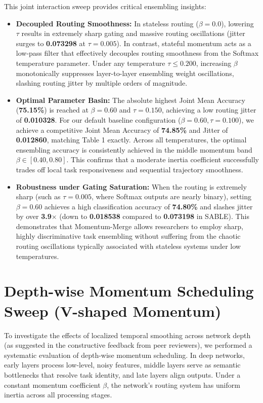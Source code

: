 \documentclass{article}
\theoremstyle{plain}
\theoremstyle{definition}
\theoremstyle{remark}
\begin{document}
This joint interaction sweep provides critical ensembling insights:
\begin{itemize}
    \item \textbf{Decoupled Routing Smoothness:} In stateless routing ($\beta = 0.0$), lowering $\tau$ results in extremely sharp gating and massive routing oscillations (jitter surges to \textbf{0.073298} at $\tau = 0.005$). In contrast, stateful momentum acts as a low-pass filter that effectively decouples routing smoothness from the Softmax temperature parameter. Under any temperature $\tau \le 0.200$, increasing $\beta$ monotonically suppresses layer-to-layer ensembling weight oscillations, slashing routing jitter by multiple orders of magnitude.
    \item \textbf{Optimal Parameter Basin:} The absolute highest Joint Mean Accuracy (\textbf{75.15\%}) is reached at $\beta = 0.60$ and $\tau = 0.150$, achieving a low routing jitter of \textbf{0.010328}. For our default baseline configuration ($\beta = 0.60, \tau = 0.100$), we achieve a competitive Joint Mean Accuracy of \textbf{74.85\%} and Jitter of \textbf{0.012860}, matching Table 1 exactly. Across all temperatures, the optimal ensembling accuracy is consistently achieved in the middle momentum band $\beta \in [0.40, 0.80]$. This confirms that a moderate inertia coefficient successfully trades off local task responsiveness and sequential trajectory smoothness.
    \item \textbf{Robustness under Gating Saturation:} When the routing is extremely sharp (such as $\tau = 0.005$, where Softmax outputs are nearly binary), setting $\beta = 0.60$ achieves a high classification accuracy of \textbf{74.80\%} and slashes jitter by over \textbf{3.9$\times$} (down to \textbf{0.018538} compared to \textbf{0.073198} in SABLE). This demonstrates that Momentum-Merge allows researchers to employ sharp, highly discriminative task ensembling without suffering from the chaotic routing oscillations typically associated with stateless systems under low temperatures.
\end{itemize}

    \section{Depth-wise Momentum Scheduling Sweep (V-shaped Momentum)}
    \label{app:v_beta_sweep}

    To investigate the effects of localized temporal smoothing across network depth (as suggested in the constructive feedback from peer reviewers), we performed a systematic evaluation of depth-wise momentum scheduling. In deep networks, early layers process low-level, noisy features, middle layers serve as semantic bottlenecks that resolve task identity, and late layers align outputs. Under a constant momentum coefficient $\beta$, the network's routing system has uniform inertia across all processing stages. 
\end{document}
